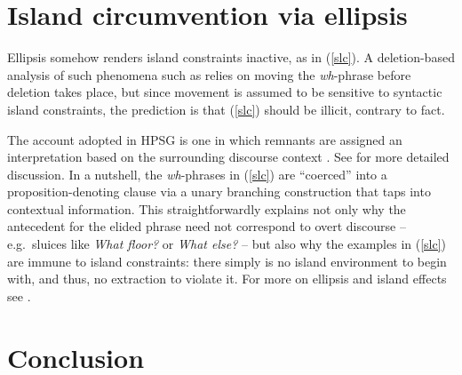 \documentclass[output=paper,biblatex,babelshorthands,newtxmath,draftmode,colorlinks,citecolor=brown]{langscibook}
\begin{document}
\section{Island circumvention via ellipsis}

Ellipsis somehow renders island constraints inactive, as in (\ref{slc}). A deletion-based analysis
of such phenomena such as \citet{merchantbook} relies on moving the \emph{wh}-phrase before deletion
takes place, but since movement is assumed to be sensitive to syntactic island constraints, the
prediction is that (\ref{slc}) should be illicit, contrary to fact.

\eal  \label{slc}



\zl

The account adopted in HPSG is one in which remnants are assigned an interpretation based on the
surrounding discourse context \citep{ginzsag,Culicover:Jackendoff:05,jacobson08,sagn}.  See
 for more detailed discussion. In a nutshell, the \emph{wh}-phrases in
(\ref{slc}) are ``coerced'' into a proposition-denoting clause via a unary branching construction
that taps into contextual information.  This straightforwardly explains not only why the antecedent
for the elided phrase need not correspond to overt discourse -- e.g.\ sluices like \emph{What
  floor?} or \emph{What else?} -- but also why the examples in (\ref{slc}) are immune to island
constraints: there simply is no island environment to begin with, and thus, no extraction to violate
it. For more on ellipsis and island effects see \citet[108--109]{CP2020a-u}.




\section{Conclusion}
\end{document}
